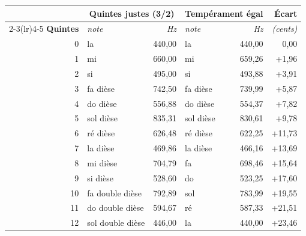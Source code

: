 
\begin{tabular}{@{}r l r l r r@{}}
\toprule
 & \multicolumn{2}{c}{\textbf{Quintes justes (3/2)}} & \multicolumn{2}{c}{\textbf{Tempérament égal}} & \textbf{Écart} \\
\cmidrule(lr){2-3}\cmidrule(lr){4-5}
\textbf{Quintes} & \textit{note} & \textit{Hz} & \textit{note} & \textit{Hz} & \textit{(cents)} \\
\midrule
0 & la & 440{,}00 & la & 440{,}00 & 0{,}00 \\
1 & mi & 660{,}00 & mi & 659{,}26 & +1{,}96 \\
2 & si & 495{,}00 & si & 493{,}88 & +3{,}91 \\
3 & fa dièse & 742{,}50 & fa dièse & 739{,}99 & +5{,}87 \\
4 & do dièse & 556{,}88 & do dièse & 554{,}37 & +7{,}82 \\
5 & sol dièse & 835{,}31 & sol dièse & 830{,}61 & +9{,}78 \\
6 & ré dièse & 626{,}48 & ré dièse & 622{,}25 & +11{,}73 \\
7 & la dièse & 469{,}86 & la dièse & 466{,}16 & +13{,}69 \\
8 & mi dièse & 704{,}79 & fa & 698{,}46 & +15{,}64 \\
9 & si dièse & 528{,}60 & do & 523{,}25 & +17{,}60 \\
10 & fa double dièse & 792{,}89 & sol & 783{,}99 & +19{,}55 \\
11 & do double dièse & 594{,}67 & ré & 587{,}33 & +21{,}51 \\
12 & sol double dièse & 446{,}00 & la & 440{,}00 & +23{,}46 \\
\bottomrule
\end{tabular}

